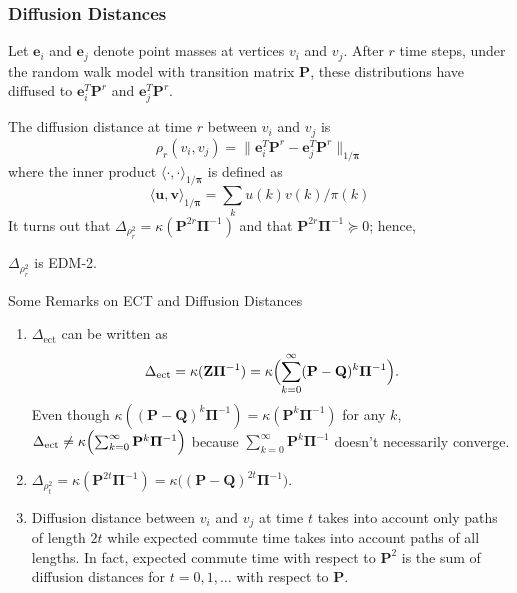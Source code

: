 \documentclass[professionalfonts, hyperref={pdfpagelabels=false,
  colorlinks=true, linkcolor=purple}]{beamer}
\begin{document}
\begin{frame}
  \frametitle{Diffusion Distances}
  Let $\bm{e}_i$ and $\bm{e}_j$ denote point masses at vertices $v_i$ and
  $v_j$. After $r$ time steps, under the random walk model with
  transition matrix $\mathbf{P}$, these distributions have diffused to
  $\bm{e}_i^{T} \mathbf{P}^{r}$ and $\bm{e}_j^{T}\mathbf{P}^{r}$. 
  
  \vskip10pt 

  The diffusion distance \cite{coifman06:_diffus_maps} at
  time $r$ between $v_i$ and $v_j$ is
    \begin{equation*}
      \rho_{r}(v_i,v_j) = \| \bm{e}_i^{T} \mathbf{P}^{r} -
      \bm{e}_j^{T}
      \mathbf{P}^{r} \|_{1/\bm{\pi}}
    \end{equation*}
    where the inner product $\langle \cdot, \cdot
    \rangle_{1/\bm{\pi}}$ is defined as
    \begin{equation*}
      \langle \bm{u}, \bm{v} \rangle_{1/\bm{\pi}} = \sum_{k} u(k)
      v(k)/\pi(k)
    \end{equation*}
    It turns out that $\Delta_{\rho_{r}^{2}} =
    \kappa(\mathbf{P}^{2r}\bm{\Pi}^{-1})$ and that
    $\mathbf{P}^{2r}\bm{\Pi}^{-1} \succeq 0$; hence,

    \vskip10pt \alert{$\Delta_{\rho_{r}^{2}}$ is EDM-2}.
\end{frame}

\begin{frame}{Some Remarks on ECT and Diffusion
  Distances}
  \begin{enumerate}
  \item $\Delta_{\mathrm{ect}}$ can be written as
    \begin{equation*}
      \Delta_{\mathrm{ect}} = \kappa(\mathbf{Z}\bm{\Pi}^{-1}) =
      \kappa\Bigl( \sum_{k=0}^{\infty}(\mathbf{P} -
      \mathbf{Q})^{k}\bm{\Pi}^{-1}\Bigr).
    \end{equation*}
    Even though $\kappa((\mathbf{P} - \mathbf{Q})^{k}\bm{\Pi}^{-1}) =
    \kappa(\mathbf{P}^{k}\bm{\Pi}^{-1})$ for any $k$, 
    $\Delta_{\mathrm{ect}} \not =
    \kappa\Bigl(\sum_{k=0}^{\infty}\mathbf{P}^{k}\bm{\Pi}^{-1}\Bigr)$
    because $\sum_{k=0}^{\infty}\mathbf{P}^{k}\bm{\Pi}^{-1}$ doesn't
    necessarily converge. 
  \item \vskip5pt $\Delta_{\rho_{t}^{2}} =
    \kappa(\mathbf{P}^{2t}\bm{\Pi}^{-1}) = \kappa\bigl((\mathbf{P} -
    \mathbf{Q})^{2t}\bm{\Pi}^{-1}\bigr)$. 
  \item \vskip5pt Diffusion distance between $v_i$ and $v_j$ at time
    $t$ takes into account only paths of length $2t$ while expected commute time
    takes into account paths of all lengths. In fact, expected commute
    time with respect to $\mathbf{P}^{2}$ is the sum of diffusion
    distances for $t = 0,1,\dots$ with respect to $\mathbf{P}$.
  \end{enumerate}
\end{frame}
\end{document}
